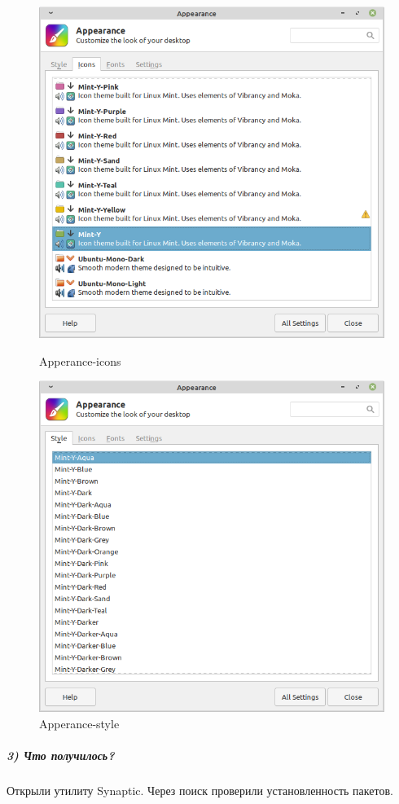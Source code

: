 \begin{figure}[!htp]
    \begin{minipage}{0.49\textwidth}
        \centering
        \includegraphics[width=\linewidth]
            {../input/task-2/3/Apperance-icons.png}
        \caption{Apperance-icons}
        \label{fig:Apperance-icons}
    \end{minipage}
    \begin{minipage}{0.49\textwidth}
        \centering
        \includegraphics[width=\linewidth]
            {../input/task-2/3/Apperance-style.png}
        \caption{Apperance-style}
        \label{fig:Apperance-style}
    \end{minipage}
\end{figure}

\subparagraph{3) Что получилось?}

Открыли утилиту Synaptic. Через поиск проверили установленность пакетов.
